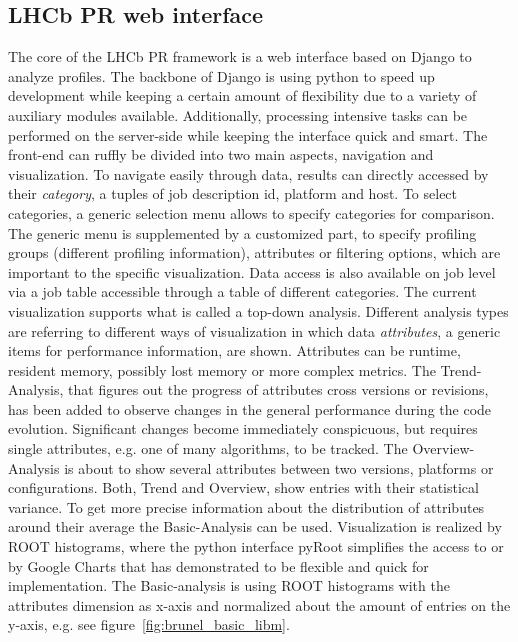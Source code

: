 \documentclass[a4paper]{jpconf}
\begin{document}
\subsection{LHCb PR web interface}
\label{sec:lhcbpr_web_interface}

The core of the LHCb PR framework is a web interface based on Django to analyze profiles. The backbone of Django is using python to speed up development while keeping a certain amount of flexibility due to a variety of auxiliary modules available. Additionally, processing intensive tasks can be performed on the server-side while keeping the interface quick and smart.
\newline
The front-end can ruffly be divided into two main aspects, navigation and visualization. To navigate easily through data, results can directly accessed by their \textit{category}, a tuples of job description id, platform and host. To select categories, a generic selection menu allows to specify categories for comparison.  The generic menu is supplemented by a customized part, to specify profiling groups (different profiling information), attributes or filtering options, which are important to the specific visualization. Data access is also available on job level via a job table accessible through a table of different categories.
\newline
The current visualization supports what is called a top-down analysis. Different analysis types are referring to different ways of visualization in which data \textit{attributes}, a generic items for performance information, are shown. Attributes can be runtime, resident memory, possibly lost memory or more complex metrics. The Trend-Analysis, that figures out the progress of attributes cross versions or revisions, has been added to observe changes in the general performance during the code evolution. Significant changes become immediately conspicuous, but requires single attributes, e.g. one of many algorithms, to be tracked. The Overview-Analysis is about to show several attributes between two versions, platforms or configurations. Both, Trend and Overview, show entries with their statistical variance. To get more precise information about the distribution of attributes around their average the Basic-Analysis can be used.
\newline
Visualization is realized by ROOT histograms, where the python interface pyRoot simplifies the access to or by Google Charts that has demonstrated to be flexible and quick for implementation. The Basic-analysis is using ROOT histograms with the attributes dimension as x-axis and normalized about the amount of entries on the y-axis, e.g. see \mbox{figure \ref{fig:brunel_basic_libm}}. 
\end{document}
